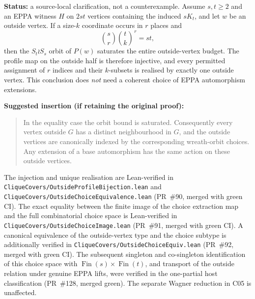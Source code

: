 \documentclass[11pt,a4paper]{article}
\begin{document}
\textbf{Status:} a source-local clarification, not a counterexample.
Assume \(s,t\ge2\) and an EPPA witness \(H\) on \(2st\) vertices
containing the induced \(sK_t\), and let \(w\) be an outside vertex.
If a size-\(k\) coordinate occurs in \(r\) places and
\[
     \binom sr\binom tk^{\,r}=st,
\]
then the \(S_t\wr S_s\) orbit of \(P(w)\) saturates the entire
outside-vertex budget. The profile map on the outside half is
therefore injective, and every permitted assignment of \(r\)
indices and their \(k\)-subsets is realised by exactly one
outside vertex. This conclusion does \emph{not} need a coherent
choice of EPPA automorphism extensions.

\textbf{Suggested insertion (if retaining the original proof):}
\begin{quote}
In the equality case the orbit bound is saturated.
Consequently every vertex outside \(G\) has a distinct
neighbourhood in \(G\), and the outside vertices are
canonically indexed by the corresponding wreath-orbit
choices. Any extension of a base automorphism has
the same action on these outside vertices.
\end{quote}

The injection and unique realisation are Lean-verified
in \texttt{CliqueCovers/OutsideProfileBijection.lean} and
\texttt{CliqueCovers/OutsideChoiceEquivalence.lean}
(PR~\#90, merged with green CI).
The exact equality between the finite image of the choice
extraction map and the full combinatorial choice space
is Lean-verified in \texttt{CliqueCovers/OutsideChoiceImage.lean}
(PR~\#91, merged with green CI). A canonical equivalence of
the outside-vertex type and the choice subtype is additionally
verified in \texttt{CliqueCovers/OutsideChoiceEquiv.lean}
(PR~\#92, merged with green CI).
The subsequent singleton and co-singleton identification of this
choice space with \(\operatorname{Fin}(s)\times\operatorname{Fin}(t)\),
and transport of the outside relation under genuine EPPA lifts,
were verified in the one-partial host classification
(PR~\#128, merged green).
The separate Wagner reduction in C05 is unaffected.
\end{document}

